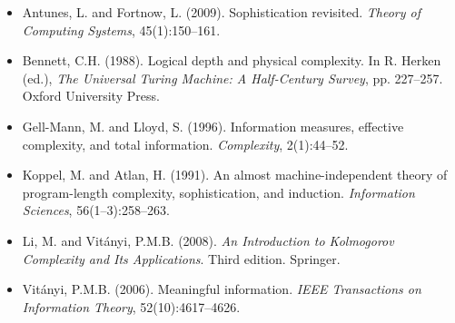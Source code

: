 \begin{itemize}
  \item Antunes, L. and Fortnow, L. (2009). Sophistication revisited. \textit{Theory of Computing Systems}, 45(1):150--161.
  \item Bennett, C.H. (1988). Logical depth and physical complexity. In R. Herken (ed.), \textit{The Universal Turing Machine: A Half-Century Survey}, pp. 227--257. Oxford University Press.
  \item Gell-Mann, M. and Lloyd, S. (1996). Information measures, effective complexity, and total information. \textit{Complexity}, 2(1):44--52.
  \item Koppel, M. and Atlan, H. (1991). An almost machine-independent theory of program-length complexity, sophistication, and induction. \textit{Information Sciences}, 56(1--3):258--263.
  \item Li, M. and Vitányi, P.M.B. (2008). \textit{An Introduction to Kolmogorov Complexity and Its Applications}. Third edition. Springer.
  \item Vitányi, P.M.B. (2006). Meaningful information. \textit{IEEE Transactions on Information Theory}, 52(10):4617--4626.
\end{itemize}
